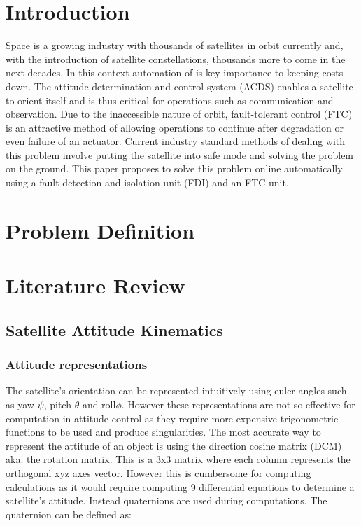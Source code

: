 \section{Introduction}

Space is a growing industry with thousands of satellites in orbit currently and, with the introduction of satellite constellations, thousands more to come in the next decades. In this context automation of is key importance to keeping costs down. The attitude determination and control system (ACDS) enables a satellite to orient itself and is thus critical for operations such as communication and observation. Due to the inaccessible nature of orbit, fault-tolerant control (FTC) is an attractive method of allowing operations to continue after degradation or even failure of an actuator. Current industry standard methods of dealing with this problem involve putting the satellite into safe mode and solving the problem on the ground. This paper proposes to solve this problem online automatically using a fault detection and isolation unit (FDI) and an FTC unit.

\section{Problem Definition}

\section{Literature Review}

\subsection{Satellite Attitude Kinematics}

\subsubsection{Attitude representations}
The satellite's orientation can be represented intuitively using euler angles such as yaw $\psi$, pitch $\theta$ and roll$\phi$. However these representations are not so effective for computation in attitude control as they require more expensive trigonometric functions to be used and produce singularities. The most accurate way to represent the attitude of an object is using the direction cosine matrix (DCM) aka. the rotation matrix. This is a 3x3 matrix where each column represents the orthogonal xyz axes vector. However this is cumbersome for computing calculations as it would require computing 9 differential equations to determine a satellite's attitude. Instead quaternions are used during computations. The quaternion can be defined as: 

